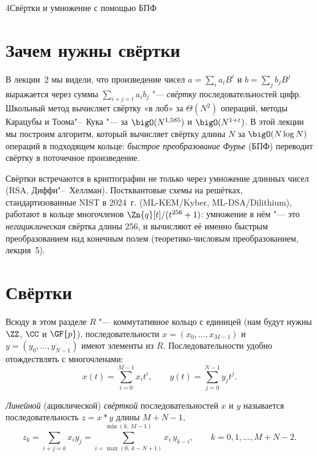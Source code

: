 \begin{lecture}{4}{Свёртки и умножение с помощью БПФ}

\section{Зачем нужны свёртки}

В лекции~2 мы видели, что произведение чисел $a = \sum_i a_i B^i$ и $b = \sum_j b_j B^j$
выражается через суммы $\sum_{i+j=t} a_i b_j$ "--- \emph{свёртку} последовательностей цифр.
Школьный метод вычисляет свёртку «в лоб» за $\Theta(N^2)$ операций, методы Карацубы и
Тоома"--~Кука "--- за $\bigO(N^{1{,}585})$ и $\bigO(N^{1+\varepsilon})$. В этой лекции мы
построим алгоритм, который вычисляет свёртку длины $N$ за $\bigO(N \log N)$ операций в подходящем
кольце: \emph{быстрое преобразование Фурье} (БПФ) переводит свёртку в поточечное произведение.

Свёртки встречаются в криптографии не только через умножение длинных чисел (RSA,
Диффи"--~Хеллман). Постквантовые схемы на решётках, стандартизованные NIST в 2024~г.
(ML-KEM/Kyber, ML-DSA/Dilithium), работают в кольце многочленов $\Zn{q}[t]/(t^{256} + 1)$:
умножение в нём "--- это \emph{негациклическая} свёртка длины $256$, и вычисляют её именно
быстрым преобразованием над конечным полем (теоретико-числовым преобразованием, лекция~5).

\section{Свёртки}

Всюду в этом разделе $R$ "--- коммутативное кольцо с единицей (нам будут нужны $\ZZ$, $\CC$
и $\GF{p}$), последовательности $x = (x_0, \dots, x_{M-1})$ и $y = (y_0, \dots, y_{N-1})$
имеют элементы из $R$. Последовательности удобно отождествлять с многочленами:
\[
  x(t) = \sum_{i=0}^{M-1} x_i t^i, \qquad y(t) = \sum_{j=0}^{N-1} y_j t^j.
\]

\begin{definition}\label{l4:linear}
\emph{Линейной} (ациклической) \emph{свёрткой} последовательностей $x$ и $y$ называется
последовательность $z = x * y$ длины $M + N - 1$,
\[
  z_k = \sum_{i + j = k} x_i y_j = \sum_{i = \max(0,\, k - N + 1)}^{\min(k,\, M - 1)} x_i\, y_{k-i},
  \qquad k = 0, 1, \dots, M + N - 2.
\]
\end{definition}


\end{lecture}
